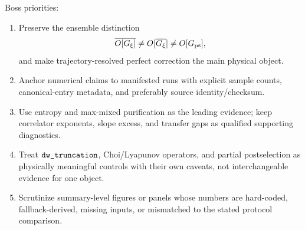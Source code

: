 \documentclass[aps,prb,onecolumn,nofootinbib,superscriptaddress]{revtex4-2}
\newcommand{\src}[1]{\texttt{\detokenize{#1}}}
\begin{document}
Boss priorities:
\begin{enumerate}
\item Preserve the ensemble distinction
\[
  \overline{O[G_\xi]} \neq O[\overline{G_\xi}] \neq O[G_{\rm ps}],
\]
and make trajectory-resolved perfect correction the main physical object.
\item Anchor numerical claims to manifested runs with explicit sample counts, canonical-entry metadata, and preferably source identity/checksum.
\item Use entropy and max-mixed purification as the leading evidence; keep correlator exponents, slope excess, and transfer gaps as qualified supporting diagnostics.
\item Treat \(\src{dw_truncation}\), Choi/Lyapunov operators, and partial postselection as physically meaningful controls with their own caveats, not interchangeable evidence for one object.
\item Scrutinize summary-level figures or panels whose numbers are hard-coded, fallback-derived, missing inputs, or mismatched to the stated protocol comparison.
\end{enumerate}
\end{document}
